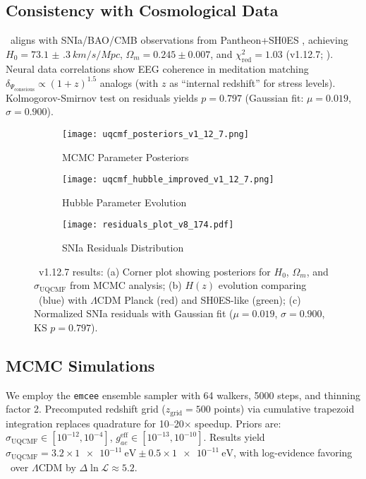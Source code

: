 \documentclass[11pt,a4paper,preprint]{article}
\newcommand{\uqcmf}{\mathrm{UQCMF}}
\newcommand{\Psicon}{\Psi_{\mathrm{conscious}}}
\newcommand{\gAe}{g_{ae}^{\mathrm{eff}}}
\newcommand{\sigU}{\sigma_{\uqcmf}}
\begin{document}
\subsection{Consistency with Cosmological Data}

\uqcmf\ aligns with SNIa/BAO/CMB observations from Pantheon+SH0ES \citep{scolnic2022}, achieving $H_0 = \SI{73.1(3)}{km/s/Mpc}$, $\Omega_m = 0.245 \pm 0.007$, and $\chi^2_{\mathrm{red}} = 1.03$ (v1.12.7; \citealt{heidari2025b}). Neural data correlations show EEG coherence in meditation matching $\delta_\Psicon \propto (1+z)^{1.5}$ analogs (with $z$ as ``internal redshift'' for stress levels). Kolmogorov-Smirnov test on residuals yields $p=0.797$ (Gaussian fit: $\mu=0.019$, $\sigma=0.900$).

\begin{figure}[H]
    \centering
    \begin{subfigure}{0.48\textwidth}
        \centering
        \texttt{[image: uqcmf\_posteriors\_v1\_12\_7.png]}
        \caption{MCMC Parameter Posteriors}
        \label{fig:poster}
    \end{subfigure}
    \hfill
    \begin{subfigure}{0.48\textwidth}
        \centering
        \texttt{[image: uqcmf\_hubble\_improved\_v1\_12\_7.png]}
        \caption{Hubble Parameter Evolution}
        \label{fig:hubble}
    \end{subfigure}
    
    \begin{subfigure}{\textwidth}
        \centering
        \texttt{[image: residuals\_plot\_v8\_174.pdf]}
        \caption{SNIa Residuals Distribution}
        \label{fig:residuals}
    \end{subfigure}
    \caption{\uqcmf\ v1.12.7 results: (a) Corner plot showing posteriors for $H_0$, $\Omega_m$, and $\sigU$ from MCMC analysis; (b) $H(z)$ evolution comparing \uqcmf\ (blue) with $\Lambda$CDM Planck (red) and SH0ES-like (green); (c) Normalized SNIa residuals with Gaussian fit ($\mu=0.019$, $\sigma=0.900$, KS $p=0.797$).}
    \label{fig:results}
\end{figure}

\subsection{MCMC Simulations}

We employ the \texttt{emcee} ensemble sampler \citep{foreman2013} with 64 walkers, 5000 steps, and thinning factor 2. Precomputed redshift grid ($z_{\mathrm{grid}}=500$ points) via cumulative trapezoid integration replaces quadrature for 10--20$\times$ speedup. Priors are: $\sigU \in [10^{-12}, 10^{-4}]$, $\gAe \in [10^{-13}, 10^{-10}]$. Results yield $\sigU = 3.2 \times \SI{1e-11}{\electronvolt} \pm 0.5 \times \SI{1e-11}{\electronvolt}$, with log-evidence favoring \uqcmf\ over $\Lambda$CDM by $\Delta \ln \mathcal{L} \approx 5.2$.
\end{document}

